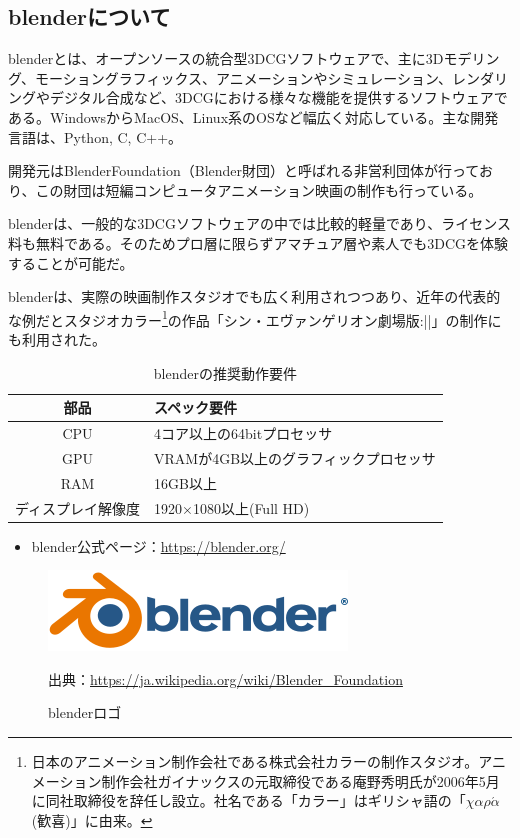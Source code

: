\documentclass[dvipdfmx]{jsarticle}
\begin{document}
\subsection{blenderについて}
blenderとは、オープンソースの統合型3DCGソフトウェアで、主に3Dモデリング、モーショングラフィックス、アニメーションやシミュレーション、レンダリングやデジタル合成など、3DCGにおける様々な機能を提供するソフトウェアである。WindowsからMacOS、Linux系のOSなど幅広く対応している。主な開発言語は、Python, C, C++。\par
開発元はBlenderFoundation（Blender財団）と呼ばれる非営利団体が行っており、この財団は短編コンピュータアニメーション映画の制作も行っている。\par
blenderは、一般的な3DCGソフトウェアの中では比較的軽量であり、ライセンス料も無料である。そのためプロ層に限らずアマチュア層や素人でも3DCGを体験することが可能だ。\par
blenderは、実際の映画制作スタジオでも広く利用されつつあり、近年の代表的な例だとスタジオカラー\footnote{日本のアニメーション制作会社である株式会社カラーの制作スタジオ。アニメーション制作会社ガイナックスの元取締役である庵野秀明氏が2006年5月に同社取締役を辞任し設立。社名である「カラー」はギリシャ語の「$\chi \alpha \rho \acute{\alpha}$(歓喜)」に由来。}の作品「シン・エヴァンゲリオン劇場版:||」の制作にも利用された。
\begin{table}[H]
  \begin{center}
    \caption{blenderの推奨動作要件}
    \begin{tabular}{|c|l|} \hline
      部品&スペック要件\\ \hline
      CPU & 4コア以上の64bitプロセッサ \\
      GPU & VRAMが4GB以上のグラフィックプロセッサ \\
      RAM & 16GB以上 \\
      ディスプレイ解像度 & 1920$\times$1080以上(Full HD)\\ \hline
    \end{tabular}
    \label{hyo01}
  \end{center}
\end{table}
\begin{itemize}
  \item blender公式ページ：\url{https://blender.org/}
\end{itemize}
\begin{figure}[H]
  \centering
  \includegraphics[scale=0.4]{images/Logo_Blender.svg.png}
  \caption{blenderロゴ}
  出典：\url{https://ja.wikipedia.org/wiki/Blender_Foundation}
\end{figure}
\end{document}
